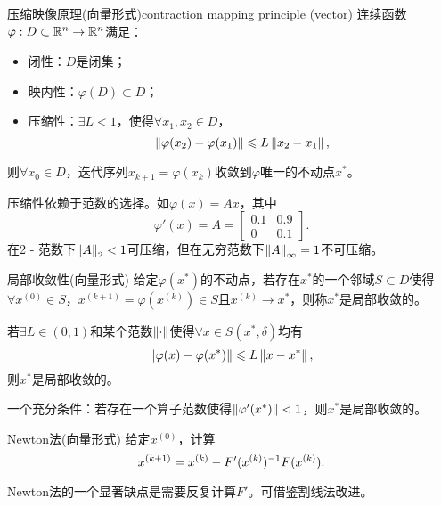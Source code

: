 \begin{theorem}
    {压缩映像原理(向量形式)}{contraction mapping principle (vector)}
    连续函数$\varphi:D\subset\mathbb R^n\to\mathbb R^n$满足：
    \begin{itemize}
        \item 闭性：$D$是闭集；
        \item 映内性：$\varphi(D)\subset D$；
        \item 压缩性：$\exists L<1$，使得$\forall x_1,x_2\in D$，
        \[
            \left\lVert\varphi(x_2)-\varphi(x_1)\right\rVert\leqslant L\left\lVert x_2-x_1\right\rVert,
        \]
    \end{itemize}
    则$\forall x_0\in D$，迭代序列$x_{k+1}=\varphi(x_k)$收敛到$\varphi$唯一的不动点$x^*$。
\end{theorem}

\begin{remark}
    压缩性依赖于范数的选择。如$\varphi(x)=Ax$，其中
    \[
        \varphi'(x)=A=\begin{bmatrix}
            0.1&0.9\\0&0.1
        \end{bmatrix}.
    \]
    在2 - 范数下$\left\lVert A\right\rVert_2<1$可压缩，但在无穷范数下$\left\lVert A\right\rVert_\infty=1$不可压缩。
\end{remark}

\begin{definition}
    {局部收敛性(向量形式)}{}
    给定$\varphi(x^*)$的不动点，若存在$x^*$的一个邻域$S\subset D$使得$\forall x^{(0)}\in S$，$x^{(k+1)}=\varphi(x^{(k)})\in S$且$x^{(k)}\to x^*$，则称$x^*$是局部收敛的。
\end{definition}

\begin{theorem}
    {}{}
    若$\exists L\in(0,1)$和某个范数$\left\lVert\cdot\right\rVert$使得$\forall x\in S(x^*,\delta)$均有
    \[
        \left\lVert\varphi(x)-\varphi(x^*)\right\rVert\leqslant L\left\lVert x-x^*\right\rVert,
    \]
    则$x^*$是局部收敛的。
\end{theorem}

\begin{corollary}
    一个充分条件：若存在一个算子范数使得$\left\lVert\varphi'(x^*)\right\rVert<1$，则$x^*$是局部收敛的。
\end{corollary}

\begin{theorem}
    {Newton法(向量形式)}{}
    给定$x^{(0)}$，计算 
    \[
        x^{(k+1)}=x^{(k)}-F'(x^{(k)})^{-1} F(x^{(k)}).
    \]
\end{theorem}

\begin{remark}
    Newton法的一个显著缺点是需要反复计算$F'$。可借鉴割线法改进。
\end{remark}


